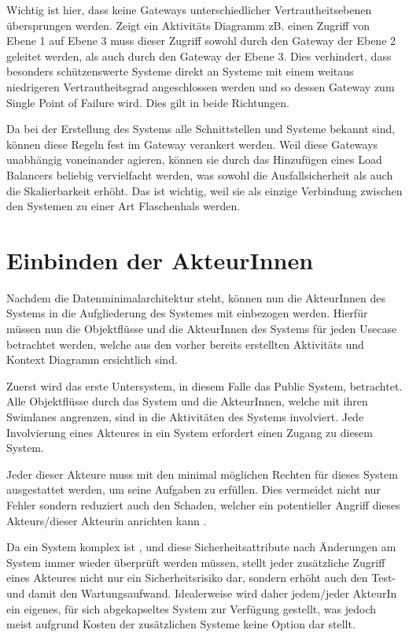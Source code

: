 Wichtig ist hier, dass keine Gateways unterschiedlicher Vertrautheitsebenen übersprungen werden. Zeigt ein Aktivitäts Diagramm zB. einen Zugriff von Ebene 1 auf Ebene 3 muss dieser Zugriff sowohl durch den Gateway der Ebene 2 geleitet werden, als auch durch den Gateway der Ebene 3. Dies verhindert, dass besonders schützenswerte Systeme direkt an Systeme mit einem weitaus niedrigeren Vertrautheitsgrad angeschlossen werden und so dessen Gateway zum Single Point of Failure wird. Dies gilt in beide Richtungen.

Da bei der Erstellung des Systems alle Schnittstellen und Systeme bekannt sind, können diese Regeln fest im Gateway verankert werden. Weil diese Gateways unabhängig voneinander agieren, können sie durch das Hinzufügen eines Load Balancers beliebig vervielfacht werden, was sowohl die Ausfallsicherheit als auch die Skalierbarkeit erhöht. Das ist wichtig, weil sie als einzige Verbindung zwischen den Systemen zu einer Art Flaschenhals werden.

\section{Einbinden der AkteurInnen}
Nachdem die Datenminimalarchitektur steht, können nun die AkteurInnen des Systems in die Aufgliederung des Systemes mit einbezogen werden. Hierfür müssen nun die Objektflüsse und die AkteurInnen des Systems für jeden Usecase betrachtet werden, welche aus den vorher bereits erstellten Aktivitäts und Kontext Diagramm ersichtlich sind.

Zuerst wird das erste Untersystem, in diesem Falle das Public System, betrachtet. Alle Objektflüsse durch das System und die AkteurInnen, welche mit ihren Swimlanes angrenzen, sind in die Aktivitäten des Systems involviert. Jede Involvierung eines Akteures in ein System erfordert einen Zugang zu diesem System.

Jeder dieser Akteure muss mit den minimal möglichen Rechten für dieses System ausgestattet werden, um seine Aufgaben zu erfüllen. Dies vermeidet nicht nur Fehler sondern reduziert auch den Schaden, welcher ein potentieller Angriff dieses Akteurs/dieser Akteurin anrichten kann \cite[1. A]{leastpriv}.

Da ein System komplex ist \cite[S. 7]{softarch}, und diese Sicherheitsattribute nach Änderungen am System immer wieder überprüft werden müssen, stellt jeder zusätzliche Zugriff eines Akteures nicht nur ein Sicherheitsrisiko dar, sondern erhöht auch den Test- und damit den Wartungsaufwand. Idealerweise wird daher jedem/jeder AkteurIn ein eigenes, für sich abgekapseltes System zur Verfügung gestellt, was jedoch meist aufgrund Kosten der zusätzlichen Systeme keine Option dar stellt.

